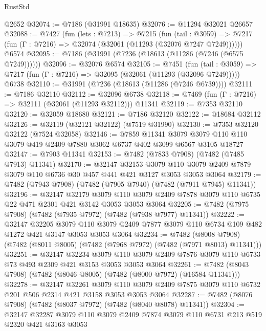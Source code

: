 \begin{lexlean}{RustStd}
\begin{coremodule}
    @2652
@32074 := @7186 (@31991 @18635)
@32076 := @11294 @32021 @26657
@32088 := @7427
    (fun (lets : @7213) =>
    @7215
      (fun (tail : @3059) =>
      @7217 (fun (Γ : @7216) => @32074 (@32061 (@11293 (@32076 @7247 @7249))))))
    @6574
@32095 := @7186 (@31991 (@7236 (@18613 (@11286 (@7246 (@6575 @7249))))))
@32096 := @32076 @6574
@32105 := @7451
    (fun (tail : @3059) => @7217 (fun (Γ : @7216) => @32095 (@32061 (@11293 (@32096 @7249)))))
    @6738
@32110 := @31991 (@7236 (@18613 (@11286 (@7246 @6739))))
@32111 := @7186 @32110
@32112 := @32096 @6738
@32118 := @7469 (fun (Γ : @7216) => @32111 (@32061 (@11293 @32112))) @11341
@32119 := @7353 @32110
@32120 := @32059 @18680
@32121 := @7186 @32120
@32122 := @18684 @32112
@32126 := @32119 (@32121 @32122) (@7519 @31990)
@32130 := @7353 @32120 @32122 (@7524 @32058)
@32146 := @7859
    @11341
    @3079
    @3079
    @110
    @110
    @3079
    @419
    @2409
    @7880
    @3062
    @6737
    @402
    @3099
    @6567
    @3105
    @18727
@32147 := @7903 @11341
@32153 := @7482 (@7833 @7908) (@7482 (@7485 @7913) @11341)
@32170 := @32147
    @32153
    @3079
    @110
    @3079
    @2409
    @7879
    @3079
    @110
    @6736
    @30
    @457
    @441
    @421
    @3127
    @3053
    @3053
    @3064
@32179 := @7482 (@7943 @7908) (@7482 (@7905 @7940) (@7482 (@7911 @7945) @11341))
@32196 := @32147
    @32179
    @3079
    @110
    @3079
    @2409
    @7878
    @3079
    @110
    @6735
    @22
    @471
    @2301
    @421
    @3142
    @3053
    @3053
    @3064
@32205 := @7482 (@7975 @7908) (@7482 (@7935 @7972) (@7482 (@7938 @7977) @11341))
@32222 := @32147
    @32205
    @3079
    @110
    @3079
    @2409
    @7877
    @3079
    @110
    @6734
    @109
    @482
    @1272
    @421
    @3147
    @3053
    @3053
    @3064
@32234 := @7482
    (@8008 @7908)
    (@7482 (@8011 @8005) (@7482 (@7968 @7972) (@7482 (@7971 @8013) @11341)))
@32251 := @32147
    @32234
    @3079
    @110
    @3079
    @2409
    @7876
    @3079
    @110
    @6733
    @73
    @493
    @2309
    @421
    @3153
    @3053
    @3053
    @3064
@32261 := @7482 (@8043 @7908) (@7482 (@8046 @8005) (@7482 (@8000 @7972) (@16584 @11341)))
@32278 := @32147
    @32261
    @3079
    @110
    @3079
    @2409
    @7875
    @3079
    @110
    @6732
    @201
    @506
    @2314
    @421
    @3158
    @3053
    @3053
    @3064
@32287 := @7482 (@8076 @7908) (@7482 (@8037 @7972) (@7482 (@8040 @8078) @11341))
@32304 := @32147
    @32287
    @3079
    @110
    @3079
    @2409
    @7874
    @3079
    @110
    @6731
    @213
    @519
    @2320
    @421
    @3163
    @3053

\end{coremodule}
\end{lexlean}
